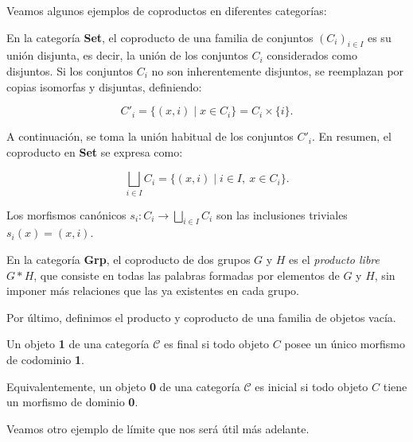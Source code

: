Veamos algunos ejemplos de coproductos en diferentes categorías:

\begin{ejemplo}
    En la categoría \textbf{Set}, el coproducto de una familia de conjuntos $\left(C_i\right)_{i \in I}$ es su unión disjunta, es decir, la unión de los conjuntos \( C_i \) considerados como disjuntos. Si los conjuntos \( C_i \) no son inherentemente disjuntos, se reemplazan por copias isomorfas y disjuntas, definiendo:

    $$
    C'_i = \{ (x, i) \mid x \in C_i \} = C_i \times \{ i \}.
    $$
    
    A continuación, se toma la unión habitual de los conjuntos \( C'_i \). En resumen, el coproducto en \textbf{Set} se expresa como:
    
    $$
    \bigsqcup_{i \in I} C_i = \{ (x, i) \mid i \in I, \ x \in C_i \}.
    $$
    
    Los morfismos canónicos $s_i: C_i \longrightarrow \bigsqcup_{i \in I} C_i$ son las inclusiones triviales $s_i(x) = (x,i)$.
\end{ejemplo}

\begin{ejemplo}
    En la categoría \textbf{Grp}, el coproducto de dos grupos \( G \) y \( H \) es el \textit{producto libre} \( G \ast H \), que consiste en todas las palabras formadas por elementos de \( G \) y \( H \), sin imponer más relaciones que las ya existentes en cada grupo.  
\end{ejemplo}

Por último, definimos el producto y coproducto de una familia de objetos vacía.

\begin{definicion}
    Un objeto \textbf{1} de una categoría $\mathscr{C}$ es final si todo objeto $C$ posee un único morfismo de codominio \textbf{1}.
    
    Equivalentemente, un objeto \textbf{0} de una categoría $\mathscr{C}$ es inicial si todo objeto $C$ tiene un morfismo de dominio \textbf{0}.
\end{definicion}


Veamos otro ejemplo de límite que nos será útil más adelante. 

